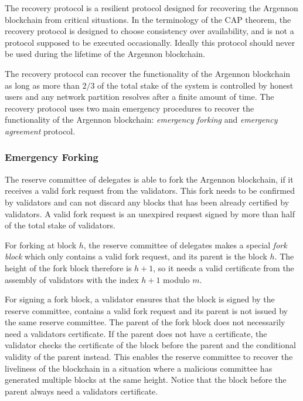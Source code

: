 The recovery protocol is a resilient protocol designed for recovering the Argennon blockchain from critical situations.
In the terminology of the CAP theorem, the recovery protocol is designed to choose consistency over availability,
and is not a protocol supposed to be executed occasionally. Ideally this protocol should never be used
during the lifetime of the Argennon blockchain.

The recovery protocol can recover the functionality
of the Argennon blockchain as long as more than $2/3$ of the total stake of the system is controlled by honest users
and any network partition resolves after a finite amount of time. The recovery protocol uses two main emergency
procedures to recover the functionality of the Argennon blockchain: \emph{emergency forking} and \emph{emergency
agreement} protocol.

\subsubsection{Emergency Forking}

The reserve committee of delegates is able to fork the Argennon blockchain, if it receives a valid fork request
from the validators.
This fork needs to be confirmed by validators and can not discard any blocks that has been already certified
by validators.
A valid fork request is an unexpired request signed by more than half of the total stake of validators.

For forking at block $h$, the reserve committee of delegates
makes a special \emph{fork block} which only contains a valid fork request, and its parent is the block $h$.
The height of the fork block therefore is
$h + 1$, so it needs a valid certificate from the assembly of validators with the index $h+1$ modulo $m$.

For signing a fork block, a validator ensures that the block is signed by the reserve committee, contains
a valid fork request and its parent is not issued by the same reserve committee. The parent of the fork block does not
necessarily need a validators certificate. If the parent does not have a certificate, the validator checks the
certificate of the block before the parent and the conditional validity of the parent instead. This enables the
reserve committee to recover the liveliness of the blockchain in a situation where a malicious committee has
generated multiple blocks at the same height. Notice that the block before the parent always need a validators
certificate.

